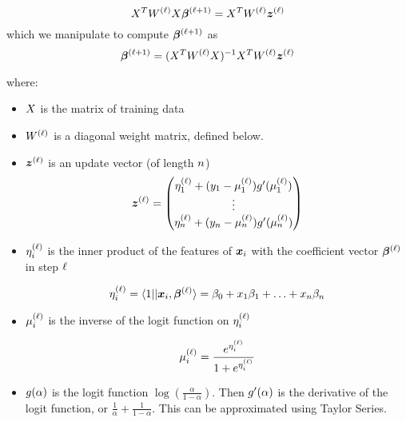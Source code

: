 \begin{equation}
	\transpose{\xdata}\wmatrix{\step}\xdata\coefficients{\step+1} = \transpose{\xdata} \wmatrix{\step} \updatevector{\step}
\end{equation}
which we manipulate to compute $\coefficients{\step+1}$ as
\begin{equation}
	\coefficients{\step+1} = \inversemat{(\transpose{\xdata}\wmatrix{\step}\xdata)}\transpose{\xdata} \wmatrix{\step}\updatevector{\step}
\end{equation}

where:
\begin{itemize}

	\item $X$ is the matrix of training data

	\item $W^{(\ell)}$ is a diagonal weight matrix, defined below.

	\item $\updatevector{\step}$ is an update vector (of length $n$)
\begin{equation*}
	\updatevector{\step} =
	\begin{pmatrix}
		\currentprediction{\step}_{1} +
		(\truelabel{1} - \logitestimate{\step}_{1})
		\gfunction'(\logitestimate{\step}_{1}) \\
		\vdots \\
		\currentprediction{\step}_{n} +
		 (\truelabel{\numdata} - \logitestimate{\step}_{\numdata})
		 \gfunction'(\logitestimate{\step}_{\numdata})
	\end{pmatrix}
\end{equation*}

\item $\eta^{(\ell)}_{i}$ is the inner product of the features of $\point{i}$ with the coefficient vector $\coefficients{\step}$ in step $\ell$
	
	\begin{equation*}
	\currentprediction{\step}_{i} = \innerproduct{1 || \point{i}}{\coefficients{\step}}  =\coeff_{0}+x_{1}\coeff_{1}+\ldots+x_{\numdata}\coeff_{\numdata}
\end{equation*}


	\item $\mu^{(\ell)}_{i}$ is the inverse of the logit function on $\eta^{(\ell)}_{i}$

\begin{equation}
	\mu^{(\ell)}_{i} = \frac{e^{\eta^{(\ell)}_{i}}}{1+e^{\eta^{(\ell)}_{i}}}
\end{equation}

	\item $g(\alpha)$ is the logit function $\log(\frac{\alpha}{1-\alpha})$. Then
$g'(\alpha)$ is the derivative of the logit function, or $\frac{1}{\alpha}+ \frac{1}{1-\alpha}$.
This can be approximated using Taylor Series.

\end{itemize}


